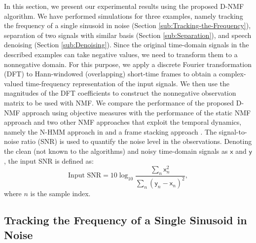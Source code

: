 \documentclass[10pt,twocolumn,twoside] {IEEEtran}
\begin{document}
In this section, we present our experimental results using the proposed D-NMF algorithm. We have performed simulations for three examples, namely tracking the frequency of a single sinusoid in noise (Section \ref{sub:Tracking-the-Frequency}), separation of two signals with similar basis (Section \ref{sub:Separation}), and speech denoising (Section \ref{sub:Denoising}). Since the original time-domain signals in the described examples can take negative values, we need to transform them to a nonnegative domain. For this purpose, we apply a discrete Fourier transformation (DFT) to Hann-windowed (overlapping) short-time frames to obtain a complex-valued time-frequency representation of the input signals. We then use the magnitudes of the DFT coefficients to construct the nonnegative observation matrix
to be used with NMF. We compare the performance
of the proposed D-NMF approach using
objective measures with the performance of the static NMF approach \cite{Smaragdis2006} and two other NMF approaches that exploit the temporal dynamics, namely the N-HMM approach in \cite{Mysore2010} and a frame stacking approach \cite{Gemmeke2011a}. The signal-to-noise ratio (SNR) is used to quantify the noise level in the observations.
Denoting the clean (not known to the algorithms) and noisy time-domain
signals as $\mathsf{x}$ and $\mathsf{y}$, the input SNR is defined as:
\begin{equation}
\text{Input SNR}=10\log_{10}\frac{\sum_{n}\mathsf{x}_{n}^{2}}{\sum_{n}\left(\mathsf{y}_{n}-\mathsf{x}_{n}\right)^{2}},\label{eq:input_SNR}
\end{equation}
where $n$ is the sample index.


\subsection{Tracking the Frequency of a Single Sinusoid in Noise\label{sub:Tracking-the-Frequency}}
\end{document}
